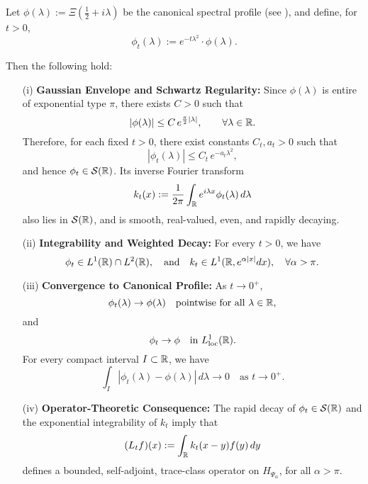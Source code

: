 \begin{lemma}
\label{lem:mollified_profile_decay}
Let \( \phi(\lambda) := \Xi\left( \tfrac{1}{2} + i\lambda \right) \) be the canonical spectral profile (see ), and define, for \( t > 0 \),
\[
\phi_t(\lambda) := e^{-t\lambda^2} \cdot \phi(\lambda).
\]

Then the following hold:

\begin{enumerate}
    \item[\textnormal{(i)}] \textbf{Gaussian Envelope and Schwartz Regularity:}  
    Since \( \phi(\lambda) \) is entire of exponential type \( \pi \), there exists \( C > 0 \) such that
    \[
    |\phi(\lambda)| \le C\, e^{\frac{\pi}{2}|\lambda|}, \qquad \forall \lambda \in \mathbb{R}.
    \]
    Therefore, for each fixed \( t > 0 \), there exist constants \( C_t, a_t > 0 \) such that
    \[
    |\phi_t(\lambda)| \le C_t\, e^{-a_t \lambda^2},
    \]
    and hence \( \phi_t \in \mathcal{S}(\mathbb{R}) \). Its inverse Fourier transform
    \[
    k_t(x) := \frac{1}{2\pi} \int_{\mathbb{R}} e^{i\lambda x} \phi_t(\lambda)\, d\lambda
    \]
    also lies in \( \mathcal{S}(\mathbb{R}) \), and is smooth, real-valued, even, and rapidly decaying.

    \item[\textnormal{(ii)}] \textbf{Integrability and Weighted Decay:}  
    For every \( t > 0 \), we have
    \[
    \phi_t \in L^1(\mathbb{R}) \cap L^2(\mathbb{R}), \quad \text{and} \quad k_t \in L^1(\mathbb{R}, e^{\alpha |x|} dx), \quad \forall \alpha > \pi.
    \]

    \item[\textnormal{(iii)}] \textbf{Convergence to Canonical Profile:}  
    As \( t \to 0^+ \),
    \[
    \phi_t(\lambda) \to \phi(\lambda) \quad \text{pointwise for all } \lambda \in \mathbb{R},
    \]
    and
    \[
    \phi_t \to \phi \quad \text{in } L^1_{\mathrm{loc}}(\mathbb{R}).
    \]
    For every compact interval \( I \subset \mathbb{R} \), we have
    \[
    \int_I |\phi_t(\lambda) - \phi(\lambda)|\, d\lambda \to 0 \quad \text{as } t \to 0^+.
    \]

    \item[\textnormal{(iv)}] \textbf{Operator-Theoretic Consequence:}  
    The rapid decay of \( \phi_t \in \mathcal{S}(\mathbb{R}) \) and the exponential integrability of \( k_t \) imply that
    \[
    (L_t f)(x) := \int_{\mathbb{R}} k_t(x - y) f(y)\, dy
    \]
    defines a bounded, self-adjoint, trace-class operator on \( H_{\Psi_\alpha} \), for all \( \alpha > \pi \).
\end{enumerate}
\end{lemma}
